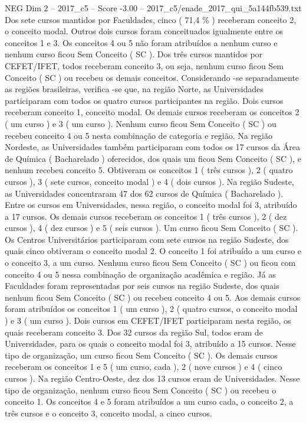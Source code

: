 \begin{textsample}{NEG Dim 2 – 2017\_c5 – Score -3.00 – 2017\_c5/enade\_2017\_qui\_5a144fb539.txt}
Dos sete cursos mantidos por Faculdades, cinco ( 71,4 \% ) receberam conceito 2, o conceito modal.
Outros dois cursos foram conceituados igualmente entre os conceitos 1 e 3.
Os conceitos 4 ou 5 não foram atribuídos a nenhum curso e nenhum curso ficou Sem Conceito ( SC ).
Dos três cursos mantidos por CEFET/IFET, todos receberam conceito 3, ou seja, nenhum curso ficou Sem Conceito ( SC ) ou recebeu os demais conceitos.
Considerando -se separadamente as regiões brasileiras, verifica -se que, na região Norte, as Universidades participaram com todos os quatro cursos participantes na região.
Dois cursos receberam conceito 1, conceito modal.
Os demais cursos receberam os conceitos 2 ( um curso ) e 3 ( um curso ).
Nenhum curso ficou Sem Conceito ( SC ) ou recebeu conceito 4 ou 5 nesta combinação de categoria e região.
Na região Nordeste, as Universidades também participaram com todos os 17 cursos da Área de Química ( Bacharelado ) oferecidos, dos quais um ficou Sem Conceito ( SC ), e nenhum recebeu conceito 5.
Obtiveram os conceitos 1 ( três cursos ), 2 ( quatro cursos ), 3 ( sete cursos, conceito modal ) e 4 ( dois cursos ).
Na região Sudeste, as Universidades concentraram 47 dos 62 cursos de Química ( Bacharelado ).
Entre os cursos em Universidades, nessa região, o conceito modal foi 3, atribuído a 17 cursos.
Os demais cursos receberam os conceitos 1 ( três cursos ), 2 ( dez cursos ), 4 ( dez cursos ) e 5 ( seis cursos ).
Um curso ficou Sem Conceito ( SC ).
Os Centros Universitários participaram com sete cursos na região Sudeste, dos quais cinco obtiveram o conceito modal 2.
O conceito 1 foi atribuído a um curso e o conceito 3, a um curso.
Nenhum curso ficou Sem Conceito ( SC ) ou ficou com conceito 4 ou 5 nessa combinação de organização acadêmica e região.
Já as Faculdades foram representadas por seis cursos na região Sudeste, dos quais nenhum ficou Sem Conceito ( SC ) ou recebeu conceito 4 ou 5.
Aos demais cursos foram atribuídos os conceitos 1 ( um curso ), 2 ( quatro cursos, o conceito modal ) e 3 ( um curso ).
Dois cursos em CEFET/IFET participaram nesta região, os quais receberam conceito 3.
Dos 32 cursos da região Sul, todos eram de Universidades, para os quais o conceito modal foi 3, atribuído a 15 cursos.
Nesse tipo de organização, um curso ficou Sem Conceito ( SC ).
Os demais cursos receberam os conceitos 1 e 5 ( um curso, cada ), 2 ( nove cursos ) e 4 ( cinco cursos ).
Na região Centro-Oeste, dez dos 13 cursos eram de Universidades.
Nesse tipo de organização, nenhum curso ficou Sem Conceito ( SC ) ou recebeu o conceito 1.
Os conceitos 4 e 5 foram atribuídos a um curso cada, o conceito 2, a três cursos e o conceito 3, conceito modal, a cinco cursos.

\end{textsample}
